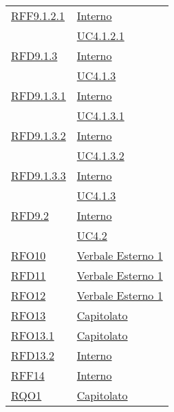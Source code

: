 \begin{longtable}{|>{\centering}m{5cm}|m{5cm}<{\centering}|}
\hyperlink{RFF9.1.2.1}{RFF9.1.2.1} & \hyperlink{Interno}{Interno}\\
& \hyperref[UC4.1.2.1]{UC4.1.2.1}\\ \hline

\hyperlink{RFD9.1.3}{RFD9.1.3} & \hyperlink{Interno}{Interno}\\
& \hyperref[UC4.1.3]{UC4.1.3}\\ \hline

\hyperlink{RFD9.1.3.1}{RFD9.1.3.1} & \hyperlink{Interno}{Interno}\\
& \hyperref[UC4.1.3.1]{UC4.1.3.1}\\ \hline

\hyperlink{RFD9.1.3.2}{RFD9.1.3.2} & \hyperlink{Interno}{Interno}\\
& \hyperref[UC4.1.3.2]{UC4.1.3.2}\\ \hline

\hyperlink{RFD9.1.3.3}{RFD9.1.3.3} & \hyperlink{Interno}{Interno}\\
& \hyperref[UC4.1.3]{UC4.1.3}\\ \hline

\hyperlink{RFD9.2}{RFD9.2} & \hyperlink{Interno}{Interno}\\
& \hyperref[UC4.2]{UC4.2}\\ \hline

\hyperlink{RFO10}{RFO10} & \hyperlink{Verbale Esterno 1}{Verbale Esterno 1}\\ \hline

\hyperlink{RFD11}{RFD11} & \hyperlink{Verbale Esterno 1}{Verbale Esterno 1}\\ \hline

\hyperlink{RFO12}{RFO12} & \hyperlink{Verbale Esterno 1}{Verbale Esterno 1}\\ \hline

\hyperlink{RFO13}{RFO13} & \hyperlink{Capitolato}{Capitolato}\\ \hline

\hyperlink{RFO13.1}{RFO13.1} & \hyperlink{Capitolato}{Capitolato}\\ \hline

\hyperlink{RFD13.2}{RFD13.2} & \hyperlink{Interno}{Interno}\\ \hline

\hyperlink{RFF14}{RFF14} & \hyperlink{Interno}{Interno}\\ \hline

\hyperlink{RQO1}{RQO1} & \hyperlink{Capitolato}{Capitolato}\\ \hline


\end{longtable}

